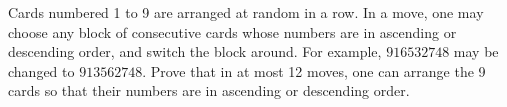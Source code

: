 Cards numbered 1 to 9 are arranged at random in a row. In a move, one may choose any block of consecutive cards whose numbers are in ascending or descending order, and switch the block around. For example, $916532748$ may be changed to $913562748$. Prove that in at most 12 moves, one can arrange the 9 cards so that their numbers are in ascending or descending order.
